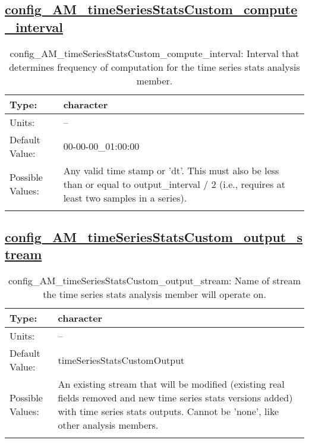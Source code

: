 \subsection[config\_AM\_timeSeriesStatsCustom\_compute\_interval]{\hyperref[sec:nm_tab_AM_timeSeriesStatsCustom]{config\_AM\_timeSeriesStatsCustom\_compute\_interval}}
\label{subsec:nm_sec_config_AM_timeSeriesStatsCustom_compute_interval}
\begin{center}
\begin{longtable}{| p{2.0in} || p{4.0in} |}
    \hline
    Type: & character \\
    \hline
    Units: & -- \\
    \hline
    Default Value: & 00-00-00\_01:00:00 \\
    \hline
    Possible Values: & Any valid time stamp or 'dt'. This must also be less than or equal to output\_interval / 2 (i.e., requires at least two samples in a series). \\
    \hline
    \caption{config\_AM\_timeSeriesStatsCustom\_compute\_interval: Interval that determines frequency of computation for the time series stats analysis member.}
\end{longtable}
\end{center}
\subsection[config\_AM\_timeSeriesStatsCustom\_output\_stream]{\hyperref[sec:nm_tab_AM_timeSeriesStatsCustom]{config\_AM\_timeSeriesStatsCustom\_output\_stream}}
\label{subsec:nm_sec_config_AM_timeSeriesStatsCustom_output_stream}
\begin{center}
\begin{longtable}{| p{2.0in} || p{4.0in} |}
    \hline
    Type: & character \\
    \hline
    Units: & -- \\
    \hline
    Default Value: & timeSeriesStatsCustomOutput \\
    \hline
    Possible Values: & An existing stream that will be modified (existing real fields removed and new time series stats versions added) with time series stats outputs. Cannot be 'none', like other analysis members. \\
    \hline
    \caption{config\_AM\_timeSeriesStatsCustom\_output\_stream: Name of stream the time series stats analysis member will operate on.}
\end{longtable}
\end{center}
